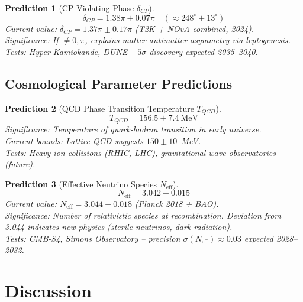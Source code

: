 \documentclass[aps,prd,preprint,superscriptaddress,showpacs,nofootinbib,longbibliography]{revtex4-2}
\newtheorem{prediction}{Prediction}
\begin{document}
\begin{prediction}[CP-Violating Phase $\delta_{CP}$]
\label{pred:deltacp}
\begin{equation}
\delta_{CP} = 1.38\pi \pm 0.07\pi \quad (\approx 248^\circ \pm 13^\circ)
\end{equation}
\textit{Current value:} $\delta_{CP} = 1.37\pi \pm 0.17\pi$ (T2K + NOvA combined, 2024).\\
\textit{Significance:} If $\neq 0, \pi$, explains matter-antimatter asymmetry via leptogenesis.\\
\textit{Tests:} Hyper-Kamiokande, DUNE -- $5\sigma$ discovery expected 2035--2040.
\end{prediction}

\subsection{Cosmological Parameter Predictions}

\begin{prediction}[QCD Phase Transition Temperature $T_{QCD}$]
\label{pred:tqcd}
\begin{equation}
T_{QCD} = 156.5 \pm 7.4~\text{MeV}
\end{equation}
\textit{Significance:} Temperature of quark-hadron transition in early universe.\\
\textit{Current bounds:} Lattice QCD suggests $150 \pm 10$~MeV.\\
\textit{Tests:} Heavy-ion collisions (RHIC, LHC), gravitational wave observatories (future).
\end{prediction}

\begin{prediction}[Effective Neutrino Species $N_{\text{eff}}$]
\label{pred:neff}
\begin{equation}
N_{\text{eff}} = 3.042 \pm 0.015
\end{equation}
\textit{Current value:} $N_{\text{eff}} = 3.044 \pm 0.018$ (Planck 2018 + BAO).\\
\textit{Significance:} Number of relativistic species at recombination. Deviation from 3.044 indicates new physics (sterile neutrinos, dark radiation).\\
\textit{Tests:} CMB-S4, Simons Observatory -- precision $\sigma(N_{\text{eff}}) \approx 0.03$ expected 2028--2032.
\end{prediction}

\section{Discussion}
\label{sec:discussion}
\end{document}
